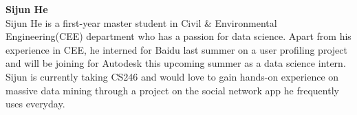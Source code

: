 \documentclass[10pt]{article}
\theoremstyle{plain}
\begin{document}
\textbf{Sijun He}\\
Sijun He is a first-year master student in Civil \& Environmental Engineering(CEE) department who has a passion for data science. Apart from his experience in CEE, he interned for Baidu last summer on a user profiling project and will be joining for Autodesk this upcoming summer as a data science intern. Sijun is currently taking CS246 and would love to gain hands-on experience on massive data mining through a project on the social network app he frequently uses everyday. 

\clearpage


\end{document}
